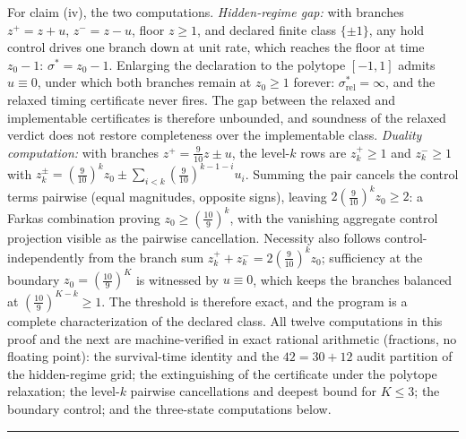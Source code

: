 \documentclass[11pt]{article}
\theoremstyle{definition}
\begin{document}
For claim (iv), the two computations. \emph{Hidden-regime gap:} with branches
\(z^{+} = z + u\), \(z^{-} = z - u\), floor \(z \ge 1\), and declared finite class
\(\{\pm 1\}\), any hold control drives one branch down at unit rate, which reaches the floor
at time \(z_{0} - 1\): \(\sigma^{*} = z_{0} - 1\). Enlarging the declaration to the polytope
\([-1,1]\) admits \(u \equiv 0\), under which both branches remain at \(z_{0} \ge 1\)
forever: \(\sigma^{*}_{\mathrm{rel}} = \infty\), and the relaxed timing certificate never
fires. The gap between the relaxed and implementable certificates is therefore unbounded,
and soundness of the relaxed verdict does not restore completeness over the implementable
class. \emph{Duality computation:} with branches \(z^{+} = \tfrac{9}{10} z \pm u\), the
level-\(k\) rows are \(z^{+}_{k} \ge 1\) and \(z^{-}_{k} \ge 1\) with
\(z^{\pm}_{k} = (\tfrac{9}{10})^{k} z_{0} \pm \sum_{i<k} (\tfrac{9}{10})^{k-1-i} u_{i}\).
Summing the pair cancels the control terms pairwise (equal magnitudes, opposite signs),
leaving \(2 (\tfrac{9}{10})^{k} z_{0} \ge 2\): a Farkas combination proving
\(z_{0} \ge (\tfrac{10}{9})^{k}\), with the vanishing aggregate control projection visible
as the pairwise cancellation. Necessity also follows control-independently from the branch
sum \(z^{+}_{k} + z^{-}_{k} = 2 (\tfrac{9}{10})^{k} z_{0}\); sufficiency at the boundary
\(z_{0} = (\tfrac{10}{9})^{K}\) is witnessed by \(u \equiv 0\), which keeps the branches
balanced at \((\tfrac{10}{9})^{K-k} \ge 1\). The threshold is therefore exact, and the
program is a complete characterization of the declared class. All twelve computations in
this proof and the next are machine-verified in exact rational arithmetic (fractions, no
floating point): the survival-time identity and the \(42 = 30 + 12\) audit partition of the
hidden-regime grid; the extinguishing of the certificate under the polytope relaxation; the
level-\(k\) pairwise cancellations and deepest bound for \(K \le 3\); the boundary control;
and the three-state computations below.
\rule{0.5\linewidth}{0.5pt}
\end{document}
